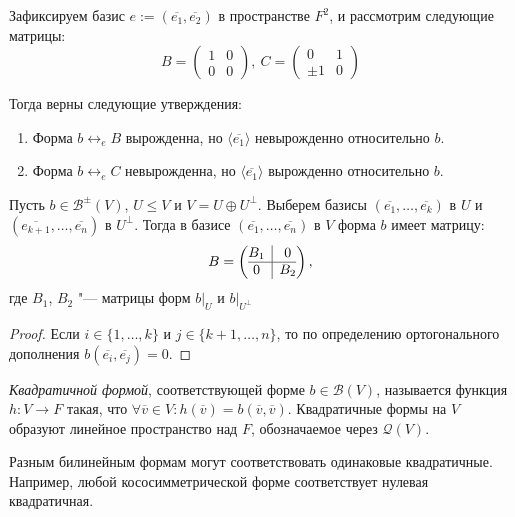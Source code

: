 \begin{example} Зафиксируем базис $e := (\overline{e_1}, \overline{e_2})$ в пространстве $F^2$, и рассмотрим следующие матрицы:
	\[B = \begin{pmatrix}1&0\\0&0\end{pmatrix},~C = \begin{pmatrix}0&1\\\pm1&0\end{pmatrix}\]
	
	Тогда верны следующие утверждения:
	\begin{enumerate}
		\item Форма $b \leftrightarrow_e B$ вырожденна, но $\langle\overline{e_1}\rangle$ невырожденно относительно $b$.
		\item Форма $b\leftrightarrow_e C$ невырожденна, но $\langle\overline{e_1}\rangle$ вырожденно относительно $b$.
	\end{enumerate}
\end{example}

\begin{proposition}
	Пусть $b \in \mathcal{B}^{\pm}(V)$, $U \le V$ и  $V = U \oplus U^{\perp}$. Выберем базисы $(\overline{e_1}, \dots, \overline{e_k})$ в $U$ и $(\overline{e_{k+1}}, \dots, \overline{e_n})$ в $U^{\perp}$. Тогда в базисе $(\overline{e_1}, \dots, \overline{e_n})$ в $V$ форма $b$ имеет матрицу:
	\[B = \left(\begin{array}{@{}c|c@{}}
		B_1 & 0\\
		\hline
		0 & B_2
	\end{array}\right),\]
	где $B_1$, $B_2$ "--- матрицы форм $b|_U$ и $b|_{U^{\perp}}$
\end{proposition}

\begin{proof}
	Если $i \in \{1, \dots, k\}$ и $j \in \{k + 1, \dots, n\}$, то по определению ортогонального дополнения $b(\overline{e_i}, \overline{e_j}) = 0$.
\end{proof}

\begin{definition}
	\textit{Квадратичной формой}, соответствующей форме $b \in \mathcal{B}(V)$, называется функция $h: V \rightarrow F$ такая, что $\forall \overline{v} \in V: h(\overline{v}) = b(\overline{v}, \overline{v})$. Квадратичные формы на $V$ образуют линейное пространство над $F$, обозначаемое через $\mathcal{Q}(V)$.
\end{definition}

\begin{note}
	Разным билинейным формам могут соответствовать одинаковые квадратичные. Например, любой кососимметрической форме соответствует нулевая квадратичная.
\end{note}

